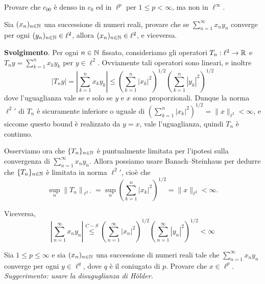\begin{exercise}
\label{ex:c00_density}
	Provare che $c_{00}$ è denso in $c_0$ ed in $\ell^p$ per $1 \leq p < \infty$, ma non in $\ell^\infty$.
\end{exercise}
\begin{exercise}
	Sia $(x_n)_{n \in \mathbb{N}}$ una successione di numeri reali, provare che se $\sum_{n=1}^\infty x_n y_n$ converge per ogni $(y_n)_{n \in \mathbb{N}} \in \ell^2$, allora $(x_n)_{n \in \mathbb{N}} \in \ell^2$, e viceversa.

	\textbf{Svolgimento}. Per ogni $n \in \mathbb{N}$ fissato, consideriamo gli operatori $T_n : \ell^2 \to \mathbb{R}$ e $T_ny = \sum_{k=1}^n x_ky_k$ per $y \in \ell^2$. Ovviamente tali operatori sono lineari, e inoltre
	\begin{equation*}
		|T_ny| = \left| \sum_{k=1}^n x_k y_k \right| \leq \left( \sum_{k=1}^n |x_k|^2\right)^{1/2} \left( \sum_{k=1}^n |y_k|^2 \right)^{1/2}
	\end{equation*}
	dove l'uguaglianza vale se e solo se $y$ e $x$ sono proporzionali. Dunque la norma ${\ell^2}'$ di $T_n$ è sicuramente inferiore o uguale di $\left( \sum_{k=1}^n |x_k|^2\right)^{1/2} = \|x\|_{\ell^2} < \infty$, e siccome questo bound è realizzato da $y=x$, vale l'uguaglianza, quindi $T_n$ è continuo.

	Osserviamo ora che $\{T_n\}_{n \in \mathbb{N}}$ è puntualmente limitata per l'ipotesi sulla convergenza di $\sum_{n=1}^\infty x_n y_n$. Allora possiamo usare Banach--Steinhaus per dedurre che $\{T_n\}_{n \in \mathbb{N}}$ è limitata in norma ${\ell^2}'$, cioè che
	\begin{equation*}
		\sup_n \|T_n\|_{{\ell^2}'} = \sup_n \left( \sum_{k=1}^n |x_k|^2 \right)^{1/2} = \|x\|_{\ell^2} < \infty.
	\end{equation*}

	Viceversa,
	\begin{equation*}
		\left| \sum_{n=1}^\infty x_n y_n \right| \overset{C-S}\leq \left( \sum_{n=1}^\infty |x_n|^2\right)^{1/2} \left( \sum_{n=1}^\infty |y_n|^2 \right)^{1/2} < \infty
	\end{equation*}
\end{exercise}

\begin{exercise}
	Sia $1 \leq p \leq \infty$ e sia $(x_n)_{n \in \mathbb{N}}$ una successione di numeri reali tale che $\sum_{n=1}^\infty x_ny_n$ converge per ogni $y \in \ell^q$, dove $q$ è il coniugato di $p$. Provare che $x \in \ell^p$. \emph{Suggerimento: usare la disuguglianza di H\"older.}
\end{exercise}


